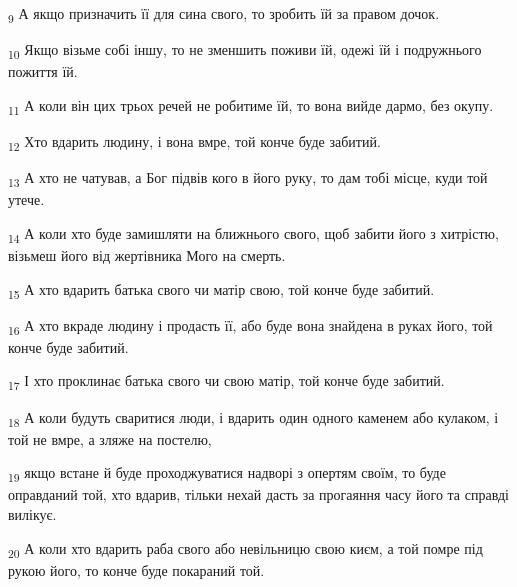 \begin{tcolorbox}
\textsubscript{9} А якщо призначить її для сина свого, то зробить їй за правом дочок.
\end{tcolorbox}
\begin{tcolorbox}
\textsubscript{10} Якщо візьме собі іншу, то не зменшить поживи їй, одежі їй і подружнього пожиття їй.
\end{tcolorbox}
\begin{tcolorbox}
\textsubscript{11} А коли він цих трьох речей не робитиме їй, то вона вийде дармо, без окупу.
\end{tcolorbox}
\begin{tcolorbox}
\textsubscript{12} Хто вдарить людину, і вона вмре, той конче буде забитий.
\end{tcolorbox}
\begin{tcolorbox}
\textsubscript{13} А хто не чатував, а Бог підвів кого в його руку, то дам тобі місце, куди той утече.
\end{tcolorbox}
\begin{tcolorbox}
\textsubscript{14} А коли хто буде замишляти на ближнього свого, щоб забити його з хитрістю, візьмеш його від жертівника Мого на смерть.
\end{tcolorbox}
\begin{tcolorbox}
\textsubscript{15} А хто вдарить батька свого чи матір свою, той конче буде забитий.
\end{tcolorbox}
\begin{tcolorbox}
\textsubscript{16} А хто вкраде людину і продасть її, або буде вона знайдена в руках його, той конче буде забитий.
\end{tcolorbox}
\begin{tcolorbox}
\textsubscript{17} І хто проклинає батька свого чи свою матір, той конче буде забитий.
\end{tcolorbox}
\begin{tcolorbox}
\textsubscript{18} А коли будуть сваритися люди, і вдарить один одного каменем або кулаком, і той не вмре, а зляже на постелю,
\end{tcolorbox}
\begin{tcolorbox}
\textsubscript{19} якщо встане й буде проходжуватися надворі з опертям своїм, то буде оправданий той, хто вдарив, тільки нехай дасть за прогаяння часу його та справді вилікує.
\end{tcolorbox}
\begin{tcolorbox}
\textsubscript{20} А коли хто вдарить раба свого або невільницю свою києм, а той помре під рукою його, то конче буде покараний той.
\end{tcolorbox}
